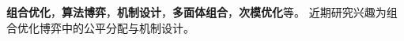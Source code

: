 %
%


\textbf{组合优化}，\textbf{算法博弈}，\textbf{机制设计}，\textbf{多面体组合}，\textbf{次模优化}等。
近期研究兴趣为组合优化博弈中的公平分配与机制设计。

